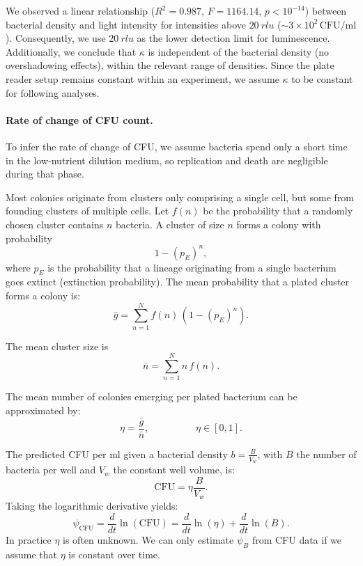 We observed a linear relationship  (\(R^2 = 0.987\), \(F = 1164.14\), \(p < 10^{-14}\)) between bacterial density and light intensity for intensities above \(\SI{20}{rlu}\) (\(\sim 3\times10^2\,\text{CFU/ml}\)).
Consequently, we use \(\SI{20}{rlu}\) as the lower detection limit for luminescence.
Additionally, we conclude that \(\kappa\) is independent of the bacterial density (no overshadowing effects), within the relevant range of densities.
Since the plate reader setup remains constant within an experiment, we assume \(\kappa\) to be constant for following analyses.

\paragraph{Rate of change of CFU count.}
To infer the rate of change of CFU, we assume bacteria spend only a short time in the low‐nutrient dilution medium, so replication and death are negligible during that phase.

Most colonies originate from clusters only comprising a single cell, but some from founding clusters of multiple cells.
Let \(f(n)\) be the probability that a randomly chosen cluster contains \(n\) bacteria.
A cluster of size \(n\) forms a colony with probability
\begin{equation}
  1-(p_E)^n,
\end{equation}
where \(p_E\) is the probability that a lineage originating from a single bacterium goes extinct (extinction probability).
The mean probability that a plated cluster forms a colony is:
\begin{equation}
  \bar g=\sum_{n=1}^{N}f(n)\,(1-(p_E)^n).
\end{equation}

The mean cluster size is
\begin{equation}
  \bar n=\sum_{n=1}^{N}n\,f(n). \label{eq:cluster_size}
\end{equation}

The mean number of colonies emerging per plated bacterium can be approximated by:
\begin{equation}
  \eta=\frac{\bar g}{\bar n},  \hspace{2cm} \eta \in [0, 1]. \label{eq:form_prob}
\end{equation}

The predicted CFU per ml given a bacterial density \(b=\frac{B}{V_w}\), with \(B\) the number of bacteria per well and \(V_w\) the constant well volume, is:
\begin{equation}
  \mathrm{CFU} = \eta \frac{B}{V_w}.
\end{equation}
Taking the logarithmic derivative yields:
\begin{equation}
  \psi_{\mathrm{CFU}} = \frac{d}{dt}\ln(\mathrm{CFU})
  = \frac{d}{dt}\ln(\eta) + \frac{d}{dt}\ln(B) .
  \label{eq:psi_cfu}
\end{equation}
In practice \(\eta\) is often unknown.
We can only estimate \(\psi_B\) from CFU data if we assume that \(\eta\) is constant over time.

